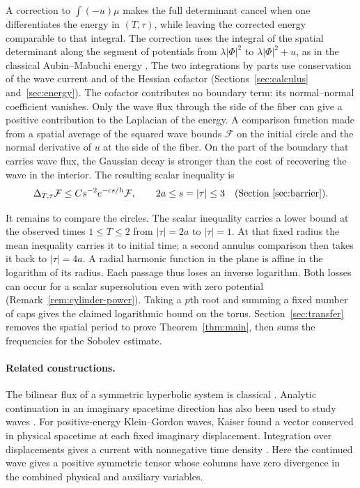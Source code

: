 A correction to $\int(-u)\mu$ makes the full determinant cancel when
one differentiates the energy in $(T,\tau)$, while leaving the corrected
energy comparable to that integral. The correction uses the integral
of the spatial determinant along the segment of potentials from
$\lambda|\Phi|^2$ to $\lambda|\Phi|^2+u$, as in the classical
Aubin--Mabuchi energy \cite{Aubin1984,Mabuchi1986}. The two integrations by parts use conservation of the
wave current and of the Hessian cofactor (Sections~\ref{sec:calculus}
and~\ref{sec:energy}). The cofactor contributes no boundary term:
its normal--normal coefficient vanishes.
Only the wave flux through the side of the fiber can give a positive
contribution to the Laplacian of the energy. A comparison function made
from a spatial average of the squared wave bounds $\mathcal F$ on the
initial circle and the normal derivative of $u$ at the side of the fiber.
On the part of the boundary that carries wave flux, the Gaussian decay
is stronger than the cost of recovering the wave in the interior.
The resulting scalar inequality is
\[
 \Delta_{T,\tau}\mathcal F\le C s^{-2}e^{-cs/h}\mathcal F,
       \qquad 2a\le s=|\tau|\le3
       \quad\text{(Section~\ref{sec:barrier}).}
\]

It remains to compare the circles. The scalar inequality carries a
lower bound at the observed times $1\le T\le2$ from $|\tau|=2a$
to $|\tau|=1$. At that fixed radius the mean inequality carries it to
initial time; a second annulus comparison then takes it back to
$|\tau|=4a$. A radial harmonic function in the plane is affine in the
logarithm of its radius. Each passage thus loses an inverse logarithm.
Both losses can occur for a scalar supersolution even with zero
potential (Remark~\ref{rem:cylinder-power}). Taking a $p$th root and
summing a fixed number of caps gives the claimed logarithmic bound on
the torus. Section~\ref{sec:transfer} removes the spatial period to prove
Theorem~\ref{thm:main}, then sums the frequencies for the Sobolev estimate.

\paragraph{Related constructions.}
The bilinear flux of a symmetric hyperbolic system is classical
\cite{Friedrichs1954}. Analytic continuation in an imaginary spacetime
direction has also been used to study waves \cite{KaiserStreater1992}.
For positive-energy Klein--Gordon waves, Kaiser found a vector
conserved in physical spacetime at each fixed imaginary displacement.
Integration over displacements gives a current with nonnegative time density
\cite[Section~4.5, Equations~(36)--(40)]{Kaiser1990}. Here the continued wave gives a positive
symmetric tensor whose columns have zero divergence in the combined
physical and auxiliary variables.


